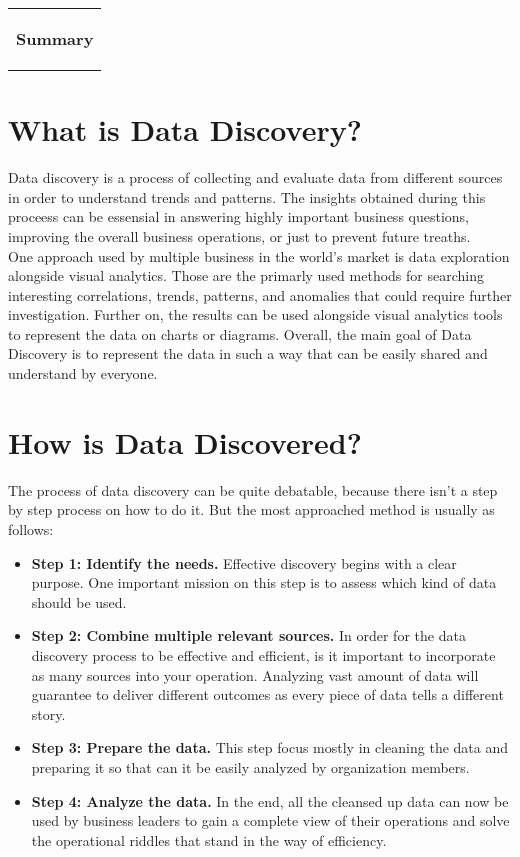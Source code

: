 %
  \addtolength{\hoffset}{0.5\evensidemargin-0.5\oddsidemargin} %
  \noindent%
  \begin{tabular}{@{}p{\textwidth}@{}}
    \begin{center}
    \Huge{\textbf{
      Summary
    }}
    \end{center}
  \end{tabular}
\section*{What is Data Discovery?}
Data discovery is a process of collecting and evaluate data from different sources in order to understand trends and patterns. The insights obtained during this proceess can be essensial in answering highly important business questions, improving the overall business operations, or just to prevent future treaths.
\vspace{2mm} %
\\ One approach used by multiple business in the world's market is data exploration alongside visual analytics. Those are the primarly used methods for searching interesting correlations, trends, patterns, and anomalies that could require further investigation. Further on, the results can be used alongside visual analytics tools to represent the data on charts or diagrams. Overall, the main goal of Data Discovery is to represent the data in such a way that can be easily shared and understand by everyone. 
\section*{How is Data Discovered?}
The process of data discovery can be quite debatable, because there isn't a step by step process on how to do it. But the most approached method is usually as follows:
\begin{itemize}
  \item \textbf{Step 1: Identify the needs.} Effective discovery begins with a clear purpose. One important mission on this step is to assess which kind of data should be used.
  \item \textbf{Step 2: Combine multiple relevant sources.} In order for the data discovery process to be effective and efficient, is it important to incorporate as many sources into your operation. Analyzing vast amount of data will guarantee to deliver different outcomes as every piece of data tells a different story.
  \item \textbf{Step 3: Prepare the data.} This step focus mostly in cleaning the data and preparing it so that can it be easily analyzed by organization members.
  \item \textbf{Step 4: Analyze the data.} In the end, all the cleansed up data can now be used by business leaders to gain a complete view of their operations and solve the operational riddles that stand in the way of efficiency.
\end{itemize} 
\pagebreak
